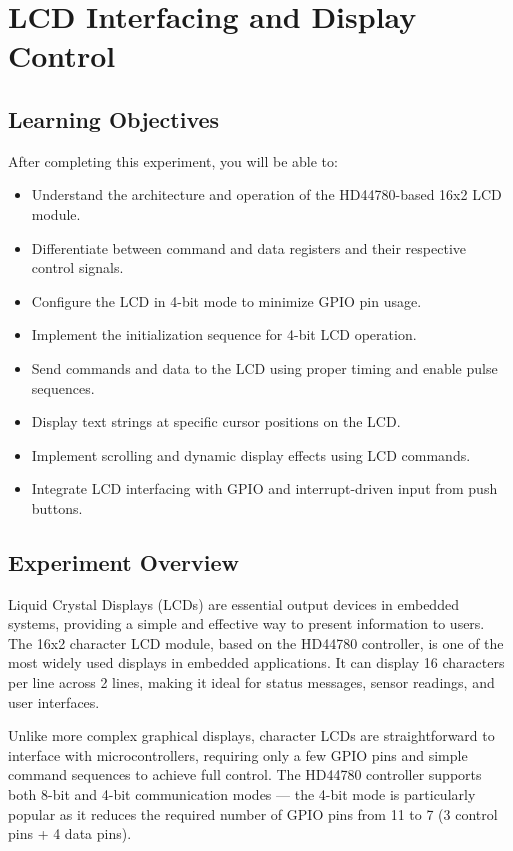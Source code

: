 \chapter{LCD Interfacing and Display Control}

\section*{Learning Objectives}
After completing this experiment, you will be able to:
\begin{itemize}[nosep]
  \item Understand the architecture and operation of the HD44780-based 16x2 LCD module.
  \item Differentiate between command and data registers and their respective control signals.
  \item Configure the LCD in 4-bit mode to minimize GPIO pin usage.
  \item Implement the initialization sequence for 4-bit LCD operation.
  \item Send commands and data to the LCD using proper timing and enable pulse sequences.
  \item Display text strings at specific cursor positions on the LCD.
  \item Implement scrolling and dynamic display effects using LCD commands.
  \item Integrate LCD interfacing with GPIO and interrupt-driven input from push buttons.
\end{itemize}

\section*{Experiment Overview}
Liquid Crystal Displays (LCDs) are essential output devices in embedded systems, providing a simple and effective way to present information to users. The 16x2 character LCD module, based on the HD44780 controller, is one of the most widely used displays in embedded applications. It can display 16 characters per line across 2 lines, making it ideal for status messages, sensor readings, and user interfaces.

\noindent Unlike more complex graphical displays, character LCDs are straightforward to interface with microcontrollers, requiring only a few GPIO pins and simple command sequences to achieve full control. The HD44780 controller supports both 8-bit and 4-bit communication modes — the 4-bit mode is particularly popular as it reduces the required number of GPIO pins from 11 to 7 (3 control pins + 4 data pins).

